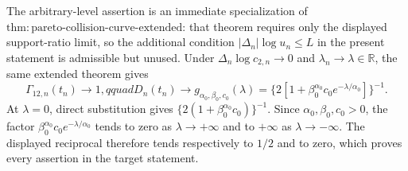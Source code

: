 The arbitrary-level assertion is an immediate specialization of \(\mathrm{thm{:}pareto\text{-}collision\text{-}curve\text{-}extended}\): that theorem requires only the displayed support-ratio limit, so the additional condition \(|\Delta_n|\log u_n\leq L\) in the present statement is admissible but unused. Under \(\Delta_n\log c_{2,n}\to0\) and \(\lambda_n\to\lambda\in\mathbb R\), the same extended theorem gives
\[
\Gamma_{12,n}(t_n)\to1,qquad
D_n(t_n)\to g_{\alpha_0,\beta_0,c_0}(\lambda)
=\{2[1+\beta_0^{\alpha_0}c_0e^{-\lambda/\alpha_0}]\}^{-1}.
\]
At \(\lambda=0\), direct substitution gives \(\{2(1+\beta_0^{\alpha_0}c_0)\}^{-1}\). Since \(\alpha_0,\beta_0,c_0>0\), the factor \(\beta_0^{\alpha_0}c_0e^{-\lambda/\alpha_0}\) tends to zero as \(\lambda\to+\infty\) and to \(+\infty\) as \(\lambda\to-\infty\). The displayed reciprocal therefore tends respectively to \(1/2\) and to zero, which proves every assertion in the target statement.